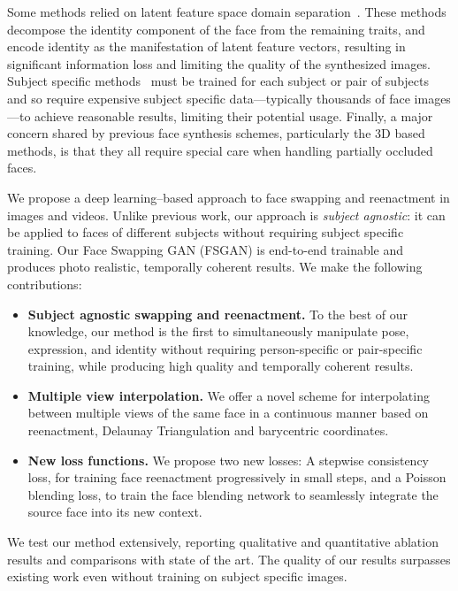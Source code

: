 Some methods relied on latent feature space domain separation~\cite{tian2018cr,natsume2018rsgan,natsume18fsnet}. These methods decompose the identity component of the face from the remaining traits, and encode identity as the manifestation of latent feature vectors, resulting in significant information loss and limiting the quality of the synthesized images. Subject specific methods~\cite{suwajanakorn2017synthesizing,DeepFakes,wayne2018reenactgan,kim2018deep} must be trained for each subject or pair of subjects and so require expensive subject specific data---typically thousands of face images---to achieve reasonable results, limiting their potential usage. Finally, a major concern shared by previous face synthesis schemes, particularly the 3D based methods, is that they all require special care when handling partially occluded faces. 

We propose a deep learning--based approach to face swapping and reenactment in images and videos. Unlike previous work, our approach is {\em subject agnostic}: it can be applied to faces of different subjects without requiring subject specific training. Our Face Swapping GAN (FSGAN) is end-to-end trainable and produces photo realistic, temporally coherent results. We make the following contributions:
\begin{itemize}
    \item {\bf Subject agnostic swapping and reenactment.} To the best of our knowledge, our method is the first to simultaneously manipulate pose, expression, and identity without requiring person-specific or pair-specific training, while producing high quality and temporally coherent results.
    \item {\bf Multiple view interpolation.} We offer a novel scheme for interpolating between multiple views of the same face in a continuous manner based on reenactment, Delaunay Triangulation and barycentric coordinates.
    \item {\bf New loss functions.} We propose two new losses: A stepwise consistency loss, for training face reenactment progressively in small steps, and a Poisson blending loss, to train the face blending network to seamlessly integrate the source face into its new context.
\end{itemize}

We test our method extensively, reporting qualitative and quantitative ablation results and comparisons with state of the art. The quality of our results surpasses existing work even without training on subject specific images. 

